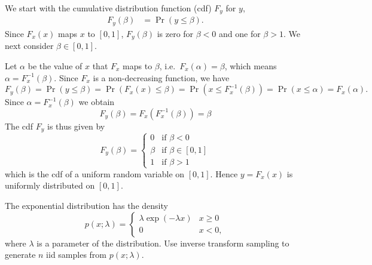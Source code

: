   \begin{solution}
    We start with the cumulative distribution function (cdf) $F_y$ for $y$,
    \begin{align}
      F_y(\beta) & = \Pr( y \le \beta).
    \end{align}
    Since $F_x(x)$ maps $x$ to $[0,1]$, $F_y(\beta)$ is zero for $\beta <0$ and one for $\beta>1$. We next consider $\beta \in [0,1]$.

   Let $\alpha$ be the value of $x$ that $F_x$ maps to $\beta$, i.e.\ $F_x(\alpha) = \beta$, which means $\alpha = F_x^{-1}(\beta)$. Since $F_x$ is a non-decreasing function, we have
    \begin{equation}
     F_y(\beta) = \Pr( y \le \beta) = \Pr( F_x(x) \le \beta) = \Pr(x \le F_x^{-1}(\beta)) = \Pr( x \le \alpha) = F_x(\alpha).
    \end{equation}
    Since $\alpha = F_x^{-1}(\beta)$ we obtain
    \begin{equation}
      F_y(\beta)  =  F_x( F_x^{-1}(\beta) ) = \beta
    \end{equation}
    The cdf $F_y$ is thus given by
    \begin{equation}
      F_y(\beta) = \begin{cases}
        0 & \text{if } \beta <0\\
        \beta & \text{if } \beta \in [0,1]\\
        1 & \text{if } \beta >1
      \end{cases}
    \end{equation}
    which is the cdf of a uniform random variable on $[0,1]$. Hence $y=F_x(x)$ is uniformly distributed on $[0,1]$.
    
  \end{solution}



The exponential distribution has the density
\begin{equation}
  p(x; \lambda) = \begin{cases} \lambda \exp(-\lambda x) & x \ge 0\\ 0
    & x<0,
  \end{cases}
  \end{equation}
where $\lambda$ is a parameter of the distribution. Use inverse transform sampling to generate $n$ iid samples from $p(x; \lambda)$.


